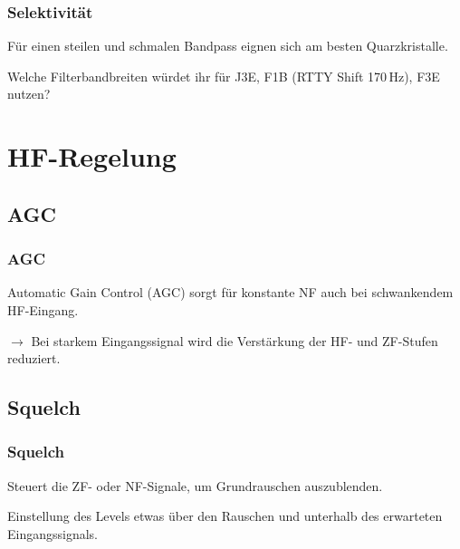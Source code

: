 \begin{frame}
    \frametitle{Selektivität}

    Für einen steilen und schmalen Bandpass eignen sich am besten
    Quarzkristalle.


    \begin{exampleblock}{Welche Filterbandbreiten würdet ihr für J3E, F1B (RTTY Shift 170\,Hz), F3E nutzen?}
    \end{exampleblock}
\end{frame}

\section{HF-Regelung}

\subsection{AGC}

\begin{frame}
    \frametitle{AGC}

    Automatic Gain Control (AGC) sorgt für konstante NF auch bei schwankendem
    HF-Eingang.

    \bigskip

    $\rightarrow$ Bei starkem Eingangssignal wird die Verstärkung der HF- und
    ZF-Stufen reduziert.

\end{frame}

\subsection{Squelch}

\begin{frame}
    \frametitle{Squelch}

    Steuert die ZF- oder NF-Signale, um Grundrauschen auszublenden.

    \bigskip

    Einstellung des Levels etwas über den Rauschen und unterhalb des erwarteten
    Eingangssignals.

\end{frame}

